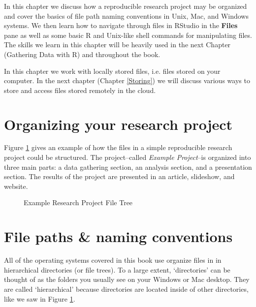 \documentclass[ChapterTOCs,krantz1]{krantz}\usepackage{graphicx, color}
\begin{document}
In this chapter we discuss how a reproducible research project may be organized and cover the basics of file path naming conventions in Unix, Mac, and Windows systems. We then learn how to navigate through files in RStudio in the {\bf{Files}} pane as well as some basic R and Unix-like shell commands for manipulating files. The skills we learn in this chapter will be heavily used in the next Chapter (Gathering Data with R) and throughout the book.

In this chapter we work with locally stored files, i.e. files stored on your computer. In the next chapter (Chapter \ref{Storing}) we will discuss various ways to store and access files stored remotely in the cloud.

\section{Organizing your research project}

Figure \ref{ExampleTree} gives an example of how the files in a simple reproducible research project could be structured. The project--called {\emph{Example Project}}--is organized into three main parts: a data gathering section, an analysis section, and a presentation section. The results of the project are presented in an article, slideshow, and website.

\clearpage
\thispagestyle{plain}
\begin{landscape}
\begin{figure}[th!]
    \caption{Example Research Project File Tree}
    \label{ExampleTree}
    \begin{center}
    
    
    \end{center}
\end{figure}
\end{landscape}

\section{File paths \& naming conventions}

All of the operating systems covered in this book use organize files in in hierarchical directories (or file trees). To a large extent, `directories' can be thought of as the folders you usually see on your Windows or Mac desktop. They are called `hierarchical' because directories are located inside of other directories, like we saw in Figure \ref{ExampleTree}. 
\end{document}
